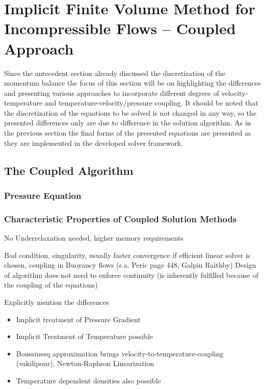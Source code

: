   \section{Implicit Finite Volume Method for Incompressible Flows -- Coupled Approach}

    Since the antecedent section already discussed the discretization of the momentum balance the focus of this section will be on highlighting the differences and presenting various approaches to incorporate different degrees of velocity-temperature and temperature-velocity/pressure coupling. It should be noted that the discretization of the equations to be solved is not changed in any way, so the presented differences only are due to difference in the solution algorithm. As in the previous section the final forms of the presented equations are presented as they are implemented in the developed solver framework. 

    \subsection{The Coupled Algorithm}
      
      \subsubsection{Pressure Equation}

      \subsubsection{Characteristic Properties of Coupled Solution Methods}

        No Underrelaxation needed, higher memory requirements

        Bad condition, singularity, usually faster convergence if efficient linear solver is chosen, coupling in Buoyancy flows (s.a. Peric page 448, Galpin Raithby)
        Design of algorithm does not need to enforce continuity (is inherently fulfilled because of the coupling of the equations)

        Explicitly mention the differences

        \begin{itemize}
          \item Implicit treatment of Pressure Gradient
          \item Implicit Treatment of Temperature possible
          \item Boussinesq approximation brings velocity-to-temperature-coupling (vakilipour), Newton-Raphson Linearization
          \item Temperature dependent densities also possible
        \end{itemize}

